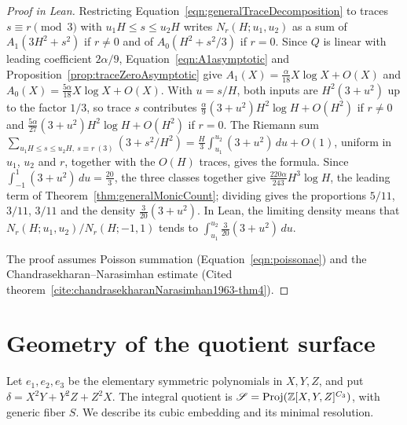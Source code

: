 \begin{proof}[Proof in Lean]

\leanok


Restricting Equation~\ref{eqn:generalTraceDecomposition} to traces $s\equiv r\pmod3$ with $u_1H\leq s\leq u_2H$ writes $N_r(H;u_1,u_2)$ as a sum of $A_1(3H^2+s^2)$ if $r\neq0$ and of $A_0(H^2+s^2/3)$ if $r=0$. Since $Q$ is linear with leading coefficient $2\alpha/9$, Equation~\ref{eqn:A1asymptotic} and Proposition~\ref{prop:traceZeroAsymptotic} give $A_1(X)=\frac{\alpha}{18}X\log X+O(X)$ and $A_0(X)=\frac{5\alpha}{18}X\log X+O(X)$. With $u=s/H$, both inputs are $H^2(3+u^2)$ up to the factor $1/3$, so trace $s$ contributes $\frac\alpha9(3+u^2)H^2\log H+O(H^2)$ if $r\neq0$ and $\frac{5\alpha}{27}(3+u^2)H^2\log H+O(H^2)$ if $r=0$. The Riemann sum $\sum_{u_1H\leq s\leq u_2H,\ s\equiv r\ (3)}(3+s^2/H^2)=\frac H3\int_{u_1}^{u_2}(3+u^2)\,du+O(1)$, uniform in $u_1$, $u_2$ and $r$, together with the $O(H)$ traces, gives the formula. Since $\int_{-1}^1(3+u^2)\,du=\frac{20}3$, the three classes together give $\frac{220\alpha}{243}H^3\log H$, the leading term of Theorem~\ref{thm:generalMonicCount}; dividing gives the proportions $5/11$, $3/11$, $3/11$ and the density $\frac3{20}(3+u^2)$. In Lean, the limiting density means that $N_r(H;u_1,u_2)/N_r(H;-1,1)$ tends to $\int_{u_1}^{u_2}\frac{3}{20}(3+u^2)\,du$.

The proof assumes Poisson summation (Equation~\ref{eqn:poissonae}) and the Chandrasekharan--Narasimhan estimate (Cited theorem~\ref{cite:chandrasekharanNarasimhan1963-thm4}).

\end{proof}

\chapter{Geometry of the quotient surface}

Let $e_1,e_2,e_3$ be the elementary symmetric polynomials in $X,Y,Z$, and put $\delta=X^2Y+Y^2Z+Z^2X$. The integral quotient is $\mathscr{S}=\operatorname{Proj}(\mathbb{Z}[X,Y,Z]^{C_3})$, with generic fiber $S$. We describe its cubic embedding and its minimal resolution.

